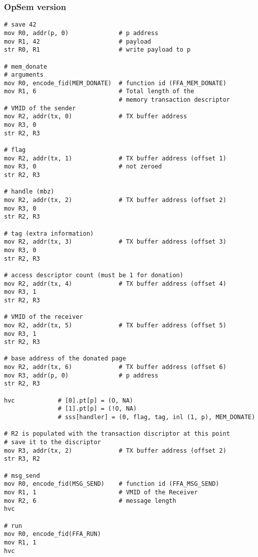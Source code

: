 \documentclass{article}
\begin{document}
\subsubsection{OpSem version}

\begin{lstlisting}[caption={VM 0}]
# save 42
mov R0, addr(p, 0)              # p address
mov R1, 42                      # payload
str R0, R1                      # write payload to p

# mem_donate
# arguments
mov R0, encode_fid(MEM_DONATE)  # function id (FFA_MEM_DONATE)
mov R1, 6                       # Total length of the  
                                # memory transaction descriptor
# VMID of the sender 
mov R2, addr(tx, 0)             # TX buffer address                               
mov R3, 0
str R2, R3

# flag
mov R2, addr(tx, 1)             # TX buffer address (offset 1)                               
mov R3, 0                       # not zeroed
str R2, R3

# handle (mbz)
mov R2, addr(tx, 2)             # TX buffer address (offset 2)
mov R3, 0
str R2, R3

# tag (extra information)
mov R2, addr(tx, 3)             # TX buffer address (offset 3)
mov R3, 0
str R2, R3

# access descriptor count (must be 1 for donation)
mov R2, addr(tx, 4)             # TX buffer address (offset 4)
mov R3, 1
str R2, R3

# VMID of the receiver
mov R2, addr(tx, 5)             # TX buffer address (offset 5)
mov R3, 1
str R2, R3

# base address of the donated page
mov R2, addr(tx, 6)             # TX buffer address (offset 6)
mov R3, addr(p, 0)              # p address
str R2, R3

hvc            # [0].pt[p] = (O, NA)
               # [1].pt[p] = (!O, NA)
               # sss[handler] = (0, flag, tag, inl (1, p), MEM_DONATE)

# R2 is populated with the transaction discriptor at this point
# save it to the discriptor
mov R3, addr(tx, 2)             # TX buffer address (offset 2)
str R3, R2

# msg_send
mov R0, encode_fid(MSG_SEND)    # function id (FFA_MSG_SEND)
mov R1, 1                       # VMID of the Receiver
mov R2, 6                       # message length
hvc

# run
mov R0, encode_fid(FFA_RUN)
mov R1, 1
hvc
\end{lstlisting}
\end{document}
